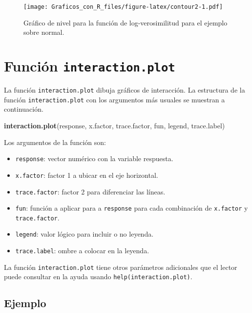\documentclass[10pt,]{krantz}
\makeatletter
\newenvironment{Shaded}{\begin{snugshade}}{\end{snugshade}}
\newcommand{\KeywordTok}[1]{\textcolor[rgb]{0.13,0.29,0.53}{\textbf{{#1}}}}
\newcommand{\NormalTok}[1]{{#1}}
\providecommand{\tightlist}{%
  \setlength{\itemsep}{0pt}\setlength{\parskip}{0pt}}
\newenvironment{kframe}{%
\medskip{}
\setlength{\fboxsep}{.8em}
 \def\at@end@of@kframe{}%
 \ifinner\ifhmode%
  \def\at@end@of@kframe{\end{minipage}}%
  \begin{minipage}{\columnwidth}%
 \fi\fi%
 \def\FrameCommand##1{\hskip\@totalleftmargin \hskip-\fboxsep
 \colorbox{shadecolor}{##1}\hskip-\fboxsep
     \hskip-\linewidth \hskip-\@totalleftmargin \hskip\columnwidth}%
 \MakeFramed {\advance\hsize-\width
   \@totalleftmargin\z@ \linewidth\hsize
   \@setminipage}}%
 {\par\unskip\endMakeFramed%
 \at@end@of@kframe}
\renewenvironment{Shaded}{\begin{kframe}}{\end{kframe}}
\makeatother
\begin{document}
\begin{figure}[htbp]
\centering
\texttt{[image: Graficos\_con\_R\_files/figure-latex/contour2-1.pdf]}
\caption{\label{fig:contour2}Gráfico de nivel para la función de
log-verosimilitud para el ejemplo sobre normal.}
\end{figure}

\section{\texorpdfstring{Función \texttt{interaction.plot}
}{Función interaction.plot  }}\label{funcion-interaction.plot}

La función \texttt{interaction.plot} dibuja gráficos de interacción. La
estructura de la función \texttt{interaction.plot} con los argumentos
más usuales se muestran a continuación.

\begin{Shaded}
\begin{Highlighting}[]
\KeywordTok{interaction.plot}\NormalTok{(response, x.factor, trace.factor, fun,}
                 \NormalTok{legend, trace.label)}
\end{Highlighting}
\end{Shaded}

Los argumentos de la función son:

\begin{itemize}
\tightlist
\item
  \texttt{response}: vector numérico con la variable respuesta.
\item
  \texttt{x.factor}: factor 1 a ubicar en el eje horizontal.
\item
  \texttt{trace.factor}: factor 2 para diferenciar las líneas.
\item
  \texttt{fun}: función a aplicar para a \texttt{response} para cada
  combinación de \texttt{x.factor} y \texttt{trace.factor}.
\item
  \texttt{legend}: valor lógico para incluir o no leyenda.
\item
  \texttt{trace.label}: ombre a colocar en la leyenda.
\end{itemize}

La función \texttt{interaction.plot} tiene otros parámetros adicionales
que el lector puede consultar en la ayuda usando
\texttt{help(interaction.plot)}.

\subsection*{Ejemplo}\label{ejemplo-19}
\end{document}
